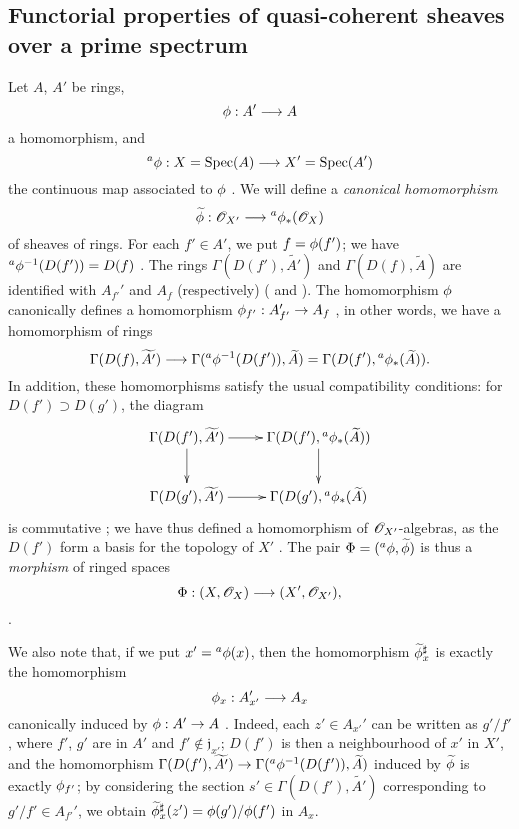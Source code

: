 \subsection{Functorial properties of quasi-coherent sheaves over a prime spectrum}
\label{subsection:I.1.6}

\begin{env}[1.6.1]
\label{I.1.6.1}
Let $A$, $A'$ be rings,
\[
  \vphi:A'\to A
\]
a homomorphism, and
\[
  {}^a\vphi:X=\Spec(A)\to X'=\Spec(A')
\]
the continuous map associated to $\phi$ .
We will define a \emph{canonical homomorphism}
\[
  \widetilde{\vphi}:\sh{O}_{X'}\to{}^a\vphi_*(\sh{O}_X)
\]
of sheaves of rings.
For each $f'\in A'$, we put $f=\phi(f')$;
we have ${}^a\phi^{-1}(D(f'))=D(f)$ .
The rings $\Gamma(D(f'),\widetilde{A'})$ and $\Gamma(D(f),\widetilde{A})$ are identified  with $A_{f'}'$ and $A_f$ (respectively) ( and ). The homomorphism $\phi$ canonically defines a homomorphism $\vphi_{f'}:A_{f'}'\to A_f$ , in other words, we have a homomorphism of rings
\[
  \Gamma(D(f),\widetilde{A'})\to\Gamma({}^a\vphi^{-1}(D(f')),\widetilde{A})
  =\Gamma(D(f'),{}^a\vphi_*(\widetilde{A})).
\]
In addition, these homomorphisms satisfy the usual compatibility conditions: for $D(f')\supset D(g')$, the diagram
\[
  \xymatrix{
    \Gamma(D(f'),\widetilde{A'})\ar[r]\ar[d] &
    \Gamma(D(f'),{}^a\vphi_*(\widetilde{A}))\ar[d]\\
    \Gamma(D(g'),\widetilde{A'})\ar[r] &
    \Gamma(D(g'),{}^a\vphi_*(\widetilde{A})
  }
\]
is commutative ;
we have thus defined a homomorphism of $\mathscr{O}_{X'}$-algebras, as the $D(f')$ form a basis for the topology of $X'$ .
The pair $\Phi=({}^a\phi,\widetilde{\phi})$ is thus a \emph{morphism} of ringed spaces
\[
  \Phi:(X,\sh{O}_X)\to(X',\sh{O}_{X'}),
\]
.

We also note that, if we put $x'={}^a\phi(x)$, then the homomorphism $\widetilde{\phi}_x^\sharp$  is exactly the homomorphism
\[
  \vphi_x:A_{x'}'\to A_x
\]
canonically induced by $\vphi:A'\to A$ .
Indeed, each $z'\in A_{x'}'$ can be written as $g'/f'$, where $f'$, $g'$ are in $A'$ and $f'\not\in\mathfrak{j}_{x'}$;
$D(f')$ is then a neighbourhood of $x'$ in $X'$, and the homomorphism $\Gamma(D(f'),\widetilde{A'})\to\Gamma({}^a\vphi^{-1}(D(f')),\widetilde{A})$ induced by $\widetilde{\phi}$ is exactly $\phi_{f'}$;
by considering the section $s'\in\Gamma(D(f'),\widetilde{A'})$ corresponding to $g'/f'\in A_{f'}'$, we obtain $\widetilde{\phi}_x^\sharp(z')=\phi(g')/\phi(f')$ in $A_x$.
\end{env}

